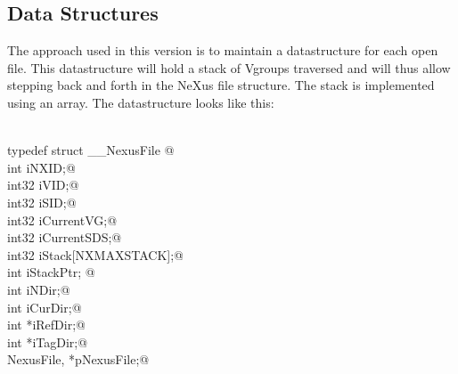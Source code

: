 \documentclass[12pt]{article}
\begin{document}
\subsection{Data Structures}
The approach used in this version is to maintain a datastructure for each
open file. This datastructure will hold a stack of Vgroups traversed and
will thus allow stepping back and forth in the NeXus file structure. The
stack is implemented using an array. The datastructure looks like this: 
\begin{flushleft} \small
\begin{minipage}{\linewidth} \label{scrap1}
\vspace{-1ex}
\begin{list}{}{} \item
\mbox{}\verb@@\\
\mbox{}\verb@    typedef struct __NexusFile {@\\
\mbox{}\verb@                                 int   iNXID;@\\
\mbox{}\verb@                                 int32 iVID;@\\
\mbox{}\verb@                                 int32 iSID;@\\
\mbox{}\verb@                                 int32 iCurrentVG;@\\
\mbox{}\verb@                                 int32 iCurrentSDS;@\\
\mbox{}\verb@                                 int32 iStack[NXMAXSTACK];@\\
\mbox{}\verb@                                 int   iStackPtr; @\\
\mbox{}\verb@                                 int iNDir;@\\
\mbox{}\verb@                                 int iCurDir;@\\
\mbox{}\verb@                                 int *iRefDir;@\\
\mbox{}\verb@                                 int *iTagDir;@\\
\mbox{}\verb@                                } NexusFile, *pNexusFile;@\\
\end{list}
\vspace{-1ex}
\footnotesize\addtolength{\baselineskip}{-1ex}
\end{minipage}\\[4ex]
\end{flushleft}
\end{document}
